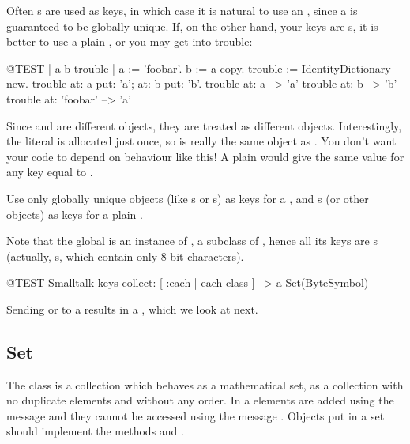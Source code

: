 \documentclass[a4paper,10pt,twoside]{book}
\begin{document}
Often s are used as keys, in which case it is natural to use an , since a  is guaranteed to be globally unique.
If, on the other hand, your keys are s, it is better to use a plain , or you may get into trouble:

\begin{code}{@TEST | a b trouble |}
a := 'foobar'.
b := a copy.
trouble := IdentityDictionary new.
trouble at: a put: 'a'; at: b put: 'b'.
trouble at: a          --> 'a'
trouble at: b          --> 'b'
trouble at: 'foobar' --> 'a'
\end{code}

\noindent
Since  and  are different objects, they are treated as different objects.
Interestingly, the literal \mbox{} is allocated just once, so is really the same object as .
You don't want your code to depend on behaviour like this!
A plain  would give the same value for any key equal to .

Use only globally unique objects (like s or s) as keys for a , and s (or other objects) as keys for a plain .


Note that the global  is an instance of , a subclass of , hence all its keys are s (actually, s, which contain only 8-bit characters).

\begin{code}{@TEST}
Smalltalk keys collect: [ :each | each class ] --> a Set(ByteSymbol)
\end{code}
\noindent
Sending  or  to a  results in a , which we look at next.

\subsection{Set}
The class  is a collection which behaves as a mathematical set, \ie as a collection with no duplicate elements and without any order. In a  elements are added using the message  and they cannot be accessed using the message . Objects put in a set should implement the methods  and \ct{=}.
\end{document}

